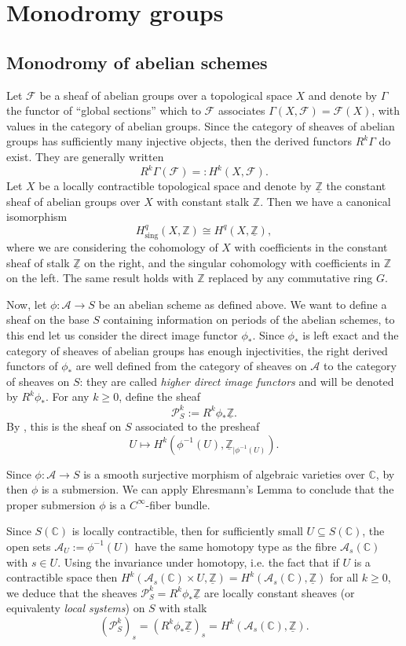 \documentclass[10 pt,a4paper]{article}
\theoremstyle{plain}
\theoremstyle{definition}
\theoremstyle{named}
\newcommand{\cA}{\mathcal A}
\newcommand{\bC}{\mathbb C}
\newcommand{\cF}{\mathcal F}
\newcommand{\cP}{\mathcal P}
\newcommand{\bZ}{\mathbb Z}
\begin{document}
\section{Monodromy groups}
\subsection{Monodromy of abelian schemes}
Let $\cF$ be a sheaf of abelian groups over a topological space $X$ and denote by $\Gamma$ the functor of ``global sections'' which to $\cF$ associates $\Gamma(X,\cF) = \cF(X)$, with values in the category of abelian groups. Since the category of sheaves of abelian groups has sufficiently many injective objects, then the derived functors $R^k\Gamma$ do exist. They are generally written
\[
R^k\Gamma(\cF)=:H^k(X,\cF).
\]
Let $X$ be a locally contractible topological space and denote by $\underline{\bZ}$ the constant sheaf of abelian groups over $X$ with constant stalk $\bZ$. Then we have a canonical isomorphism
\[
H^q_{\textrm{sing}}(X,\bZ) \cong H^q(X,\underline{\bZ}),
\]
where we are considering the cohomology of $X$ with coefficients in the constant sheaf of stalk $\underline{\bZ}$ on the right, and the singular cohomology with coefficients in $\bZ$ on the left. The same result holds with $\bZ$ replaced by any commutative ring $G$.

Now, let $\phi:\cA \to S$ be an abelian scheme as defined above. We want to define a sheaf on the base $S$ containing information on periods of the abelian schemes, to this end let us consider the direct image functor $\phi_*$. Since $\phi_*$ is left exact and the category of sheaves of abelian groups has enough injectivities, the right derived functors of $\phi_*$ are well defined from the category of sheaves on $\cA$ to the category of sheaves on $S$: they are called \emph{higher direct image functors} and will be denoted by $R^k\phi_*$. For any $k \ge 0$, define the sheaf
\[
\cP_S^k:=R^k\phi_*\underline{\bZ}.
\]
By \cite[Proposition 8.1]{Hart}, this is the sheaf on $S$ associated to the presheaf
\[
U \mapsto H^k(\phi^{-1}(U),\underline{\bZ}_{|\phi^{-1}(U)}).
\]

Since $\phi:\cA \to S$ is a smooth surjective morphism of algebraic varieties over $\bC$, by \cite[Theorem 10.4]{Hart} then $\phi$ is a submersion. We can apply Ehresmann's Lemma to conclude that the proper submersion $\phi$ is a $C^\infty$-fiber bundle.

Since $S(\bC)$ is locally contractible, then for sufficiently small $U \subseteq S(\bC)$, the open sets $\cA_U:=\phi^{-1}(U)$ have the same homotopy type as the fibre $\cA_s(\bC)$ with $s \in U$. Using the invariance under homotopy, i.e. the fact that if $U$ is a contractible space then $H^k(\cA_s(\bC) \times U,\underline{\bZ}) = H^k(\cA_s(\bC), \underline{\bZ})$ for all $k \ge 0$, we deduce that the sheaves $\cP_S^k=R^k\phi_*\underline{\bZ}$ are locally constant sheaves (or equivalenty \emph{local systems}) on $S$ with stalk
\[
(\cP_S^k)_s=(R^k\phi_*\underline{\bZ})_s = H^k(\cA_s(\bC),\underline{\bZ}).
\]
\end{document}
